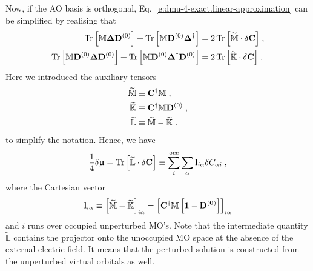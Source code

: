 \documentclass[aip,graphicx]{revtex4-1}
\newcommand{\BM}[1]{\bm{#1}}
\DeclareMathOperator{\Tr}{Tr}
\begin{document}
Now, if the AO basis is orthogonal, Eq.~\eqref{e:dmu-4-exact.linear-approximation} can be simplified by realising that
%
\begin{subequations}
 \begin{align}
  \Tr{ 
    \left[ 
         {\mathbb{M}} {\BM\Delta} {\bf D}^{(0)}  
    \right] }
%
  +\Tr{ 
    \left[ 
         {\mathbb{M}} {\bf D}^{(0)} {\BM\Delta}^{\dagger}
    \right] }
  &=
2 \Tr{ 
    \left[ 
         \widetilde{\mathbb{M}} \cdot \delta {\bf C}
   \right] }  \;,
%
\\
%
  \Tr{ 
    \left[ 
         {\mathbb{M}} {\bf D}^{(0)} {\BM\Delta} {\bf D}^{(0)}
    \right] }
%
 +\Tr{ 
    \left[ 
         {\mathbb{M}} {\bf D}^{(0)} {\BM\Delta}^{\dagger} {\bf D}^{(0)}
    \right] }
  &=
2 \Tr{ 
    \left[ 
         \widetilde{\mathbb{K}} \cdot \delta {\bf C}
   \right] } \;.
%
 \end{align}
\end{subequations}
%
Here we introduced the auxiliary tensors
%
\begin{subequations}
 \begin{align}
   \widetilde{\mathbb{M}}  &\equiv {\bf C}^\dagger {\mathbb{M}}     \;,           \\
   \widetilde{\mathbb{K}}  &\equiv {\bf C}^\dagger {\mathbb{M}} {\bf D}^{(0)} \;, \\
   \widetilde{\mathbb{L}}  &\equiv \widetilde{\mathbb{M}} - \widetilde{\mathbb{K}} \;.
 \end{align}
\end{subequations}
%
to simplify the notation. Hence, we have
%
\begin{equation} \label{e:dmu-l-vector}
  \frac{1}{4} 
 \delta {\BM{\upmu}} %
   =
   \Tr{ 
    \left[ 
         \widetilde{\mathbb{L}} \cdot \delta {\bf C}
    \right] }
   \equiv \sum_{i}^{\rm occ} \sum_\alpha {\bf l}_{i\alpha} \delta C_{\alpha i} \;,
\end{equation}
%
where the Cartesian vector
%
\begin{equation}\label{e:l-vector}
 {\bf l}_{i\alpha} \equiv \left[ \widetilde{\mathbb{M}} - \widetilde{\mathbb{K}} \right]_{i\alpha} 
      = \left[  {\bf C}^\dagger \mathbb{M} \left[ \bf{1} - \bf{D}^{(0)} \right] \right]_{i\alpha}
\end{equation}
%
and $i$ runs over occupied unperturbed MO's.
Note that the intermediate quantity $\widetilde{\mathbb{L}}$ contains the projector onto
the unoccupied MO space at the absence of the external electric field. It means that the
perturbed solution is constructed from the unperturbed virtual orbitals as well.
\end{document}
